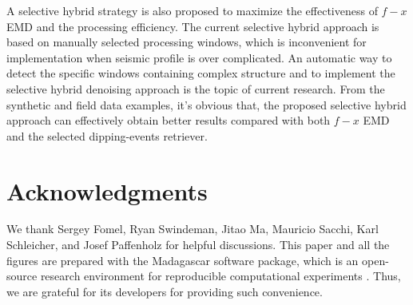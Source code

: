 A selective hybrid strategy is also proposed to maximize the effectiveness of $f-x$ EMD and the processing efficiency. The current selective hybrid approach is based on manually selected processing windows, which is inconvenient for implementation when seismic profile is over complicated. An automatic way to detect the specific windows containing complex structure and to implement the selective hybrid denoising approach is the topic of current research.  From the synthetic and field data examples, it's obvious that, the proposed selective hybrid approach can effectively obtain better results compared with both $f-x$ EMD and the selected dipping-events retriever.

\section{Acknowledgments} 
We thank Sergey Fomel, Ryan Swindeman, Jitao Ma, Mauricio Sacchi, Karl Schleicher, and Josef Paffenholz for helpful discussions.  This paper and all the figures are prepared with the Madagascar software package, which is an open-source research environment for reproducible computational experiments \cite[]{mada2013}. Thus, we are grateful for its developers for providing such convenience. 








